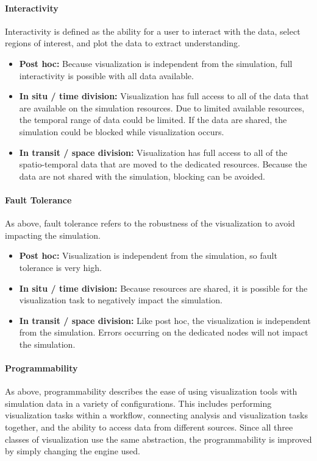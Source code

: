 \documentclass[x11names,table,xcdraw,graybox]{svmult}
\begin{document}
\paragraph{\textbf{Interactivity}}
Interactivity is defined as the ability for a user to interact with the data, select regions of interest, and plot the data to extract understanding.
\begin{itemize}
    \item \textbf{Post hoc:} Because visualization is independent from the simulation, full interactivity is possible with all data available.
    \item \textbf{In situ / time division:} Visualization has full access to all of the data that are available on the simulation resources. Due to limited available resources, the temporal range of data could be limited. If the data are shared, the simulation could be blocked while visualization occurs.
    \item \textbf{In transit / space division:} Visualization has full access to all of the spatio-temporal data that are moved to the dedicated resources. Because the data are not shared with the simulation, blocking can be avoided.
\end{itemize}


\paragraph{\textbf{Fault Tolerance}}
As above, fault tolerance refers to the robustness of the visualization to avoid impacting the simulation.
\begin{itemize}
    \item \textbf{Post hoc:} Visualization is independent from the simulation, so fault tolerance is very high.
    \item \textbf{In situ / time division:} Because resources are shared, it is possible for the visualization task to negatively impact the simulation.
    \item \textbf{In transit / space division:} Like post hoc, the visualization is independent from the simulation. Errors occurring on the dedicated nodes will not impact the simulation.
\end{itemize}

\paragraph{\textbf{Programmability}}
As above, programmability describes the ease of using visualization tools with simulation data in a variety of configurations. This includes performing visualization tasks within a workflow, connecting analysis and visualization tasks together, and the ability to access data from different sources.
 Since all three classes of visualization use the same abstraction, the programmability is improved by simply  changing the engine used.
\end{document}
